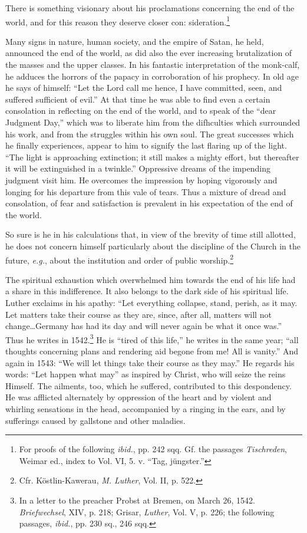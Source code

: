 There is something visionary about his proclamations concerning
the end of the world, and for this reason they deserve closer con:
sideration.\footnote
{For proofs of the following \textit{ibid.}, pp. 242 sqq. Gf. the passages
\textit{Tischreden}, Weimar ed., index to Vol. VI, 5. v. “Tag, jüngster.”}

Many signs in nature, human society, and the empire of Satan, he
held, announced the end of the world, as did also the ever increasing
brutalization of the masses and the upper classes. In his fantastic interpretation
of the monk-calf, he adduces the horrors of the papacy
in corroboration of his prophecy. In old age he says of himself: “Let
the Lord call me hence, I have committed, seen, and suffered sufficient
of evil.” At that time he was able to find even a certain consolation
in reflecting on the end of the world, and to speak of the “dear
Judgment Day,” which was to liberate him from the difhculties which
surrounded his work, and from the struggles within his own soul. The
great successes which he finally experiences, appear to him to signify
the last flaring up of the light. “The light is approaching extinction;
it still makes a mighty effort, but thereafter it will be extinguished in
a twinkle.” Oppressive dreams of the impending judgment visit him.
He overcomes the impression by hoping vigorously and longing for his
departure from this vale of tears. Thus a mixture of dread and consolation,
of fear and satisfaction is prevalent in his expectation of the
end of the world.

So sure is he in his calculations that, in view of the brevity of time
still allotted, he does not concern himself particularly about the discipline
of the Church in the future, \textit{e.g.}, about the institution and
order of public worship.\footnote{Cfr. Köstlin-Kawerau, \textit{M. Luther}, Vol. II, p. 522.}

The spiritual exhaustion which overwhelmed him towards the end
of his life had a share in this indifference. It also belongs to the dark
side of his spiritual life. Luther exclaims in his apathy: “Let everything
collapse, stand, perish, as it may. Let matters take their course
as they are, since, after all, matters will not change\dots Germany
has had its day and will never again be what it once was.” Thus he
writes in 1542.\footnote
{In a letter to the preacher Probst at Bremen, on March 26, 1542. \textit{Briefwechsel}, XIV,
p. 218; Grisar, \textit{Luther}, Vol. V, p. 226; the following passages, \textit{ibid.}, pp. 230 sq., 246
sqq.}
He is “tired of this life,” he writes in the same year;
“all thoughts concerning plans and rendering aid begone from me!
All is vanity.” And again in 1543: “We will let things take their
course as they may.” He regards his words: “Let happen what may”
as inspired by Christ, who will seize the reins Himself. The ailments,
too, which he suffered, contributed to this despondency. He was
afflicted alternately by oppression of the heart and by violent and
whirling sensations in the head, accompanied by a ringing in the
ears, and by sufferings caused by gallstone and other maladies.

